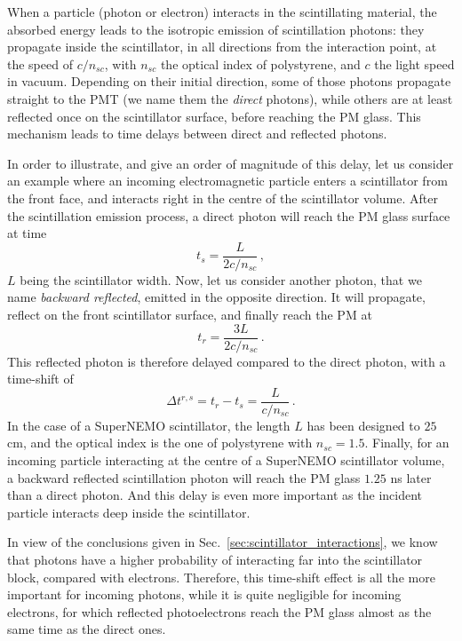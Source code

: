 When a particle (photon or electron) interacts in the scintillating material, the absorbed energy leads to the isotropic emission of scintillation photons:
they propagate inside the scintillator, in all directions from the interaction point, at the speed of $c/n_{sc}$, with $n_{sc}$ the optical index of polystyrene, and $c$ the light speed in vacuum.
Depending on their initial direction, some of those photons propagate straight to the PMT (we name them the \emph{direct} photons), while others are at least reflected once on the scintillator surface, before reaching the PM glass.
This mechanism leads to time delays between direct and reflected photons.

In order to illustrate, and give an order of magnitude of this delay, let us consider an example where an incoming electromagnetic particle enters a scintillator from the front face, and interacts right in the centre of the scintillator volume.
After the scintillation emission process, a direct photon will reach the PM glass surface at time
\begin{equation}
  t_{s} = \frac{L}{2c/n_{sc}}\,,
\end{equation}
$L$ being the scintillator width.
Now, let us consider another photon, that we name \emph{backward reflected}, emitted in the opposite direction.
It will propagate, reflect on the front scintillator surface, and finally reach the PM at
\begin{equation}
  t_{r} = \frac{3L}{2c/n_{sc}}\,.
\end{equation}
This reflected photon is therefore delayed compared to the direct photon, with a time-shift of
\begin{equation}
  \Delta t^{r,s} = t_{r} - t_{s} = \frac{L}{c/n_{sc}}\,.
\end{equation}
In the case of a SuperNEMO scintillator, the length $L$ has been designed to $25$ cm, and the optical index is the one of polystyrene with $n_{sc}=1.5$.
Finally, for an incoming particle interacting at the centre of a SuperNEMO scintillator volume, a backward reflected scintillation photon will reach the PM glass $1.25$ ns later than a direct photon.
And this delay is even more important as the incident particle interacts deep inside the scintillator.

In view of the conclusions given in Sec.~\ref{sec:scintillator_interactions}, we know that photons have a higher probability of interacting far into the scintillator block, compared with electrons.
Therefore, this time-shift effect is all the more important for incoming photons, while it is quite negligible for incoming electrons, for which reflected photoelectrons reach the PM glass almost as the same time as the direct ones.

